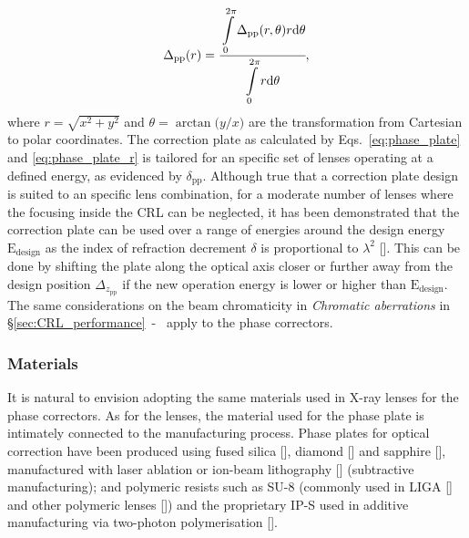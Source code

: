 \begin{refsection}
\begin{equation}\label{eq:phase_plate_r}
   \Delta_\text{pp}(r)=\cfrac{\displaystyle\int\limits_{0}^{2\pi}{\Delta_\text{pp}(r,\theta)r\text{d}\theta}}{\displaystyle\int\limits_{0}^{2\pi}{r\text{d}\theta}},
\end{equation}
where $r=\sqrt{x^2 + y^2}$ and $\theta=\arctan{\big(y/x\big)}$ are the transformation from Cartesian to polar coordinates. The correction plate as calculated by Eqs.~\ref{eq:phase_plate} and \ref{eq:phase_plate_r} is tailored for an specific set of lenses operating at a defined energy, as evidenced by $\delta_\text{pp}$. Although true that a correction plate design is suited to an specific lens combination, for a moderate number of lenses where the focusing inside the CRL can be neglected, it has been demonstrated that the correction plate can be used over a range of energies around the design energy $\text{E}_\text{design}$ as the index of refraction decrement $\delta$ is proportional to $\lambda^2$ [\cite[\textit{\S6}]{Seiboth2018}]. This can be done by shifting the plate along the optical axis closer or further away from the design position $\Delta_{z_\text{pp}}$ if the new operation energy is lower or higher than $\text{E}_\text{design}$. The same considerations on the beam chromaticity in \textit{Chromatic aberrations} in \S\ref{sec:CRL_performance}~-~\textit{} apply to the phase correctors. 


\subsubsection*{Materials}

It is natural to envision adopting the same materials used in X-ray lenses for the phase correctors. As for the lenses, the material used for the phase plate is intimately connected to the manufacturing process. Phase plates for optical correction have been produced using fused silica [\cite{Seiboth2017}], diamond [\cite{Polikarpov2016, Antipov2020}] and sapphire [\cite{Lin2020}], manufactured with laser ablation or ion-beam lithography [\cite{Medvedskaya2020}] (subtractive manufacturing); and polymeric resists such as SU-8 (commonly used in LIGA [\cite{Nazmov2004}] and other polymeric lenses [\cite{Stohr2015}]) and the proprietary IP-S used in additive manufacturing via two-photon polymerisation [\cite{Petrov2017, Roth2018, Sanli2018, Abrashitova2020,Lin2020}]. 



\end{refsection}
